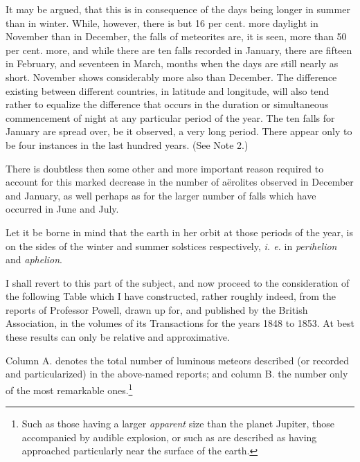 \documentclass[a4paper, 12pt, oneside]{article}
\begin{document}
It may be argued, that this is in consequence of the days being longer in summer than in winter. While, however, there is but 16 per cent. more daylight in November than in December, the falls of meteorites are, it is seen, more than 50 per cent. more, and while there are ten falls recorded in January, there are fifteen in February, and seventeen in March, months when the days are still nearly as short. November shows considerably more also than December. The difference existing between different countries, in latitude and longitude, will also tend rather to equalize the difference that occurs in the duration or simultaneous commencement of night at any particular period of the year. The ten falls for January are spread over, be it observed, a very long period. There appear only to be four instances in the last hundred years. (See Note 2.)

There is doubtless then some other and more important reason required to account for this marked decrease in the number of aërolites observed in December and January, as well perhaps as for the larger number of falls which have occurred in June and July.

Let it be borne in mind that the earth in her orbit at those periods of the year, is on the sides of the winter and summer solstices respectively, \emph{i. e.} in \emph{perihelion} and \emph{aphelion}.

I shall revert to this part of the subject, and now proceed to the consideration of the following Table which I have constructed, rather roughly indeed, from the reports of Professor Powell, drawn up for, and published by the British Association, in the volumes of its Transactions for the years 1848 to 1853. At best these results can only be relative and approximative.

Column A. denotes the total number of luminous meteors described (or recorded and particularized) in the above-named reports; and column B. the number only of the most remarkable ones.\footnote{Such as those having a larger \emph{apparent} size than the planet Jupiter, those accompanied by audible explosion, or such as are described as having approached particularly near the surface of the earth.}
\end{document}
